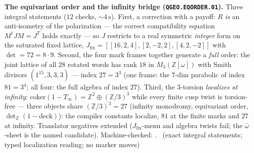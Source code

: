 \par\smallskip\noindent\textbf{The equivariant order and the infinity
bridge (\texttt{QGEO.EQORDER.01}).}
Three integral statements ($12$ checks, ${\sim}4$\,s).  First, a
correction with a payoff: $R$ \emph{is} an anti-isometry of the
polarization --- the correct compatibility equation
$M^\dagger JM=J^T$ holds exactly --- so $J$ restricts to a real
symmetric \emph{integer} form on the saturated fixed lattice,
$J_{\mathrm{fix}}=[[16,2,4],[2,-2,2],[4,2,-2]]$ with
$\det=72=8\cdot9$.  Second, the four mark frames together generate a
\emph{full} order: the joint lattice of all $28$ rotated words has
rank $18$ in $M_3(\mathbb{Z}[\omega])$ with Smith divisors
$(1^{15},3,3,3)$ --- index $27=3^3$ (one frame: the $7$-dim parabolic
of index $81=3^4$; all four: the full algebra of index $27$).  Third,
the 3-torsion \emph{localizes at infinity}:
$\mathrm{coker}(1-T_\infty)=\mathbb{Z}^2\oplus(\mathbb{Z}/3)^3$ while
every finite cusp twist is torsion-free --- three objects share
$(\mathbb{Z}/3)^3=27$ (infinity monodromy, equivariant order,
$\det_{\mathbb{Z}}(1-\mathrm{deck})$): the compiler constants
localize, $81$ at the finite marks and $27$ at infinity.  Translator
negatives extended ($J_{\mathrm{fix}}$-menu and algebra twists fail;
the $\bar\omega$-sheet is the named candidate).
Machine-checked: .
\mE\ (exact integral statements; typed localization reading; no
marker moves)
\par\smallskip
